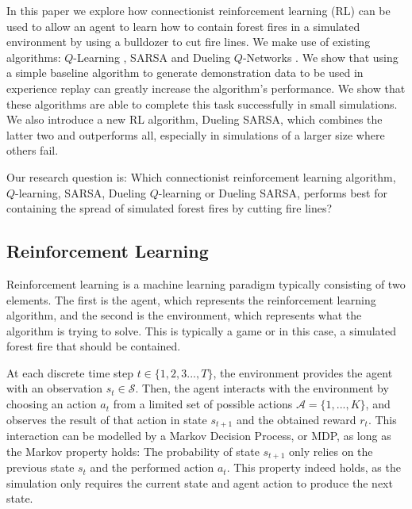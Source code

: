 In this paper we explore how connectionist reinforcement learning (RL) can be used to allow an agent to learn how to contain forest fires in a simulated environment by using a bulldozer to cut fire lines. We make use of existing algorithms: $Q$-Learning \citep{watkins1989learning}, SARSA \citep{rummery1994line} and Dueling $Q$-Networks \citep{wang2015dueling}. We show that using a simple baseline algorithm to generate demonstration data to be used in experience replay can greatly increase the algorithm's performance. We show that these algorithms are able to complete this task successfully in small simulations. We also introduce a new RL algorithm, Dueling SARSA, which combines the latter two and outperforms all, especially in simulations of a larger size where others fail.

Our research question is: Which connectionist reinforcement learning algorithm, $Q$-learning, SARSA, Dueling $Q$-learning or Dueling SARSA, performs best for containing the spread of simulated forest fires by cutting fire lines?


\subsection{Reinforcement Learning}\label{sec:reinforcementlearning}
Reinforcement learning \citep{sutton_barto_2018} is a machine learning paradigm typically consisting of two elements. The first is the agent, which represents the reinforcement learning algorithm, and the second is the environment, which represents what the algorithm is trying to solve. This is typically a game or in this case, a simulated forest fire that should be contained.

At each discrete time step $t \in \{1,2,3...,T\}$, the environment provides the agent with an observation $s_t \in \mathcal{S}$. Then, the agent interacts with the environment by choosing an action $a_t$ from a limited set of possible actions $\mathcal{A}=\{1,...,K\}$, and observes the result of that action in state $s_{t+1}$ and the obtained reward $r_t$. This interaction can be modelled by a Markov Decision Process, or MDP, as long as the Markov property holds: The probability of state $s_{t+1}$ only relies on the previous state $s_t$ and the performed action $a_t$. This property indeed holds, as the simulation only requires the current state and agent action to produce the next state.

